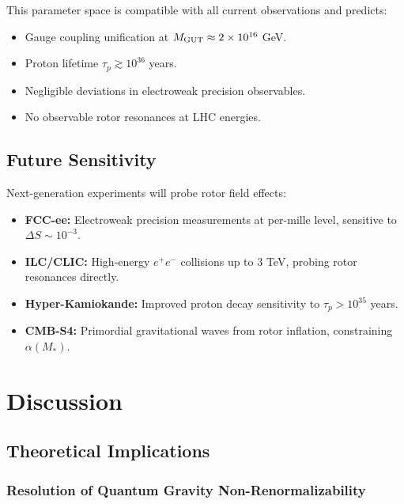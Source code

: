 \documentclass[11pt,a4paper]{article}
\numberwithin{equation}{section}
\theoremstyle{plain}
\theoremstyle{definition}
\theoremstyle{remark}
\begin{document}
This parameter space is compatible with all current observations and predicts:
\begin{itemize}
  \item Gauge coupling unification at $M_{\rm GUT}\approx 2\times 10^{16}$ GeV.
  \item Proton lifetime $\tau_p \gtrsim 10^{36}$ years.
  \item Negligible deviations in electroweak precision observables.
  \item No observable rotor resonances at LHC energies.
\end{itemize}

\subsection{Future Sensitivity}

Next-generation experiments will probe rotor field effects:
\begin{itemize}
  \item \textbf{FCC-ee:} Electroweak precision measurements at per-mille level, sensitive to $\Delta S\sim 10^{-3}$.
  \item \textbf{ILC/CLIC:} High-energy $e^+e^-$ collisions up to 3 TeV, probing rotor resonances directly.
  \item \textbf{Hyper-Kamiokande:} Improved proton decay sensitivity to $\tau_p > 10^{35}$ years.
  \item \textbf{CMB-S4:} Primordial gravitational waves from rotor inflation, constraining $\alpha(M_*)$.
\end{itemize}

\vspace{1em}

\section{Discussion}\label{sec:discussion}

\subsection{Theoretical Implications}

\subsubsection{Resolution of Quantum Gravity Non-Renormalizability}
\end{document}
